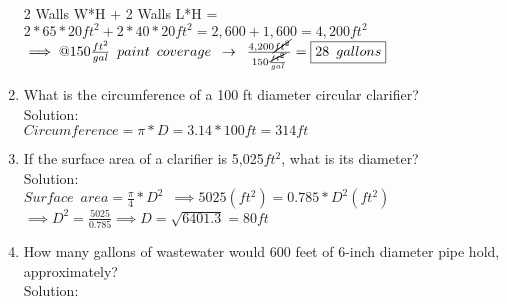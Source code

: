 \begin{enumerate}
\begin{tikzpicture}
\end{tikzpicture}\\
\vspace{0.3cm}
2 Walls W*H + 2 Walls L*H = $2*65*20ft^2 + 2*40*20ft^2= 2,600+1,600=4,200ft^2$\\
$\implies @150\frac{ft^2}{gal} \enspace paint \enspace coverage \enspace \rightarrow \enspace \frac{4,200\cancel{ft^2}}{150\frac{\cancel{ft^2}}{gal}}=\boxed{28 \enspace gallons}$
\vspace{0.3cm}
\item What is the circumference of a 100 ft diameter circular clarifier?\\
\vspace{0.3cm}
Solution:\\
\vspace{0.3cm}
$Circumference=\pi*D=3.14*100ft=\boxed{314ft}$
\vspace{0.3cm}
\item If the surface area of a clarifier is 5,025$ft^2$, what is its diameter?\\
\vspace{0.3cm}
Solution:\\
\vspace{0.3cm}
$Surface \enspace area=\frac{\pi}{4}*D^2 \enspace \implies 5025(ft^2)=0.785*D^2 (ft^2)$\\
$\implies D^2=\frac{5025}{0.785} \implies D=\sqrt{6401.3}=\boxed{80ft}$
\vspace{0.3cm}

\item How many gallons of wastewater would 600 feet of 6-inch diameter pipe hold, approximately?\\
\vspace{0.3cm}
Solution:\\


\end{enumerate}
